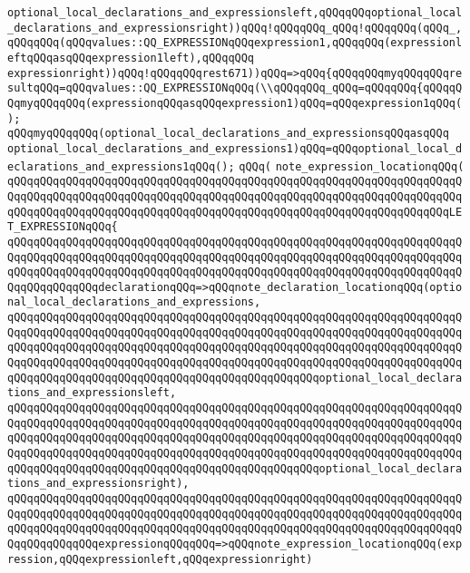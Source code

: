 \verb|optional_local_declarations_and_expressionsleft,qQQqqQQqoptional_local_declarations_and_expressionsright))qQQq!qQQqqQQq_qQQq!qQQqqQQq(qQQq_,qQQqqQQq(qQQqvalues::QQ_EXPRESSIONqQQqexpression1,qQQqqQQq(expressionleftqQQqasqQQqexpression1left),qQQqqQQq|\newline
\verb|expressionright))qQQq!qQQqqQQqrest671))qQQq=>qQQq{qQQqqQQqmyqQQqqQQqresultqQQq=qQQqvalues::QQ_EXPRESSIONqQQq(\\qQQqqQQq_qQQq=qQQqqQQq{qQQqqQQqmyqQQqqQQq(expressionqQQqasqQQqexpression1)qQQq=qQQqexpression1qQQq();|\newline
\verb|qQQqmyqQQqqQQq(optional_local_declarations_and_expressionsqQQqasqQQq|\newline
\verb|optional_local_declarations_and_expressions1)qQQq=qQQqoptional_local_declarations_and_expressions1qQQq();|\newline
\verb|qQQq(|\newline
\verb|note_expression_locationqQQq(|\newline
\verb|qQQqqQQqqQQqqQQqqQQqqQQqqQQqqQQqqQQqqQQqqQQqqQQqqQQqqQQqqQQqqQQqqQQqqQQqqQQqqQQqqQQqqQQqqQQqqQQqqQQqqQQqqQQqqQQqqQQqqQQqqQQqqQQqqQQqqQQqqQQqqQQqqQQqqQQqqQQqqQQqqQQqqQQqqQQqqQQqqQQqqQQqqQQqqQQqqQQqqQQqqQQqqQQqLET_EXPRESSIONqQQq{|\newline
\verb|qQQqqQQqqQQqqQQqqQQqqQQqqQQqqQQqqQQqqQQqqQQqqQQqqQQqqQQqqQQqqQQqqQQqqQQqqQQqqQQqqQQqqQQqqQQqqQQqqQQqqQQqqQQqqQQqqQQqqQQqqQQqqQQqqQQqqQQqqQQqqQQqqQQqqQQqqQQqqQQqqQQqqQQqqQQqqQQqqQQqqQQqqQQqqQQqqQQqqQQqqQQqqQQqqQQqqQQqqQQqqQQqdeclarationqQQq=>qQQqnote_declaration_locationqQQq(optional_local_declarations_and_expressions,|\newline
\verb|qQQqqQQqqQQqqQQqqQQqqQQqqQQqqQQqqQQqqQQqqQQqqQQqqQQqqQQqqQQqqQQqqQQqqQQqqQQqqQQqqQQqqQQqqQQqqQQqqQQqqQQqqQQqqQQqqQQqqQQqqQQqqQQqqQQqqQQqqQQqqQQqqQQqqQQqqQQqqQQqqQQqqQQqqQQqqQQqqQQqqQQqqQQqqQQqqQQqqQQqqQQqqQQqqQQqqQQqqQQqqQQqqQQqqQQqqQQqqQQqqQQqqQQqqQQqqQQqqQQqqQQqqQQqqQQqqQQqqQQqqQQqqQQqqQQqqQQqqQQqqQQqqQQqqQQqqQQqqQQqqQQqqQQqoptional_local_declarations_and_expressionsleft,|\newline
\verb|qQQqqQQqqQQqqQQqqQQqqQQqqQQqqQQqqQQqqQQqqQQqqQQqqQQqqQQqqQQqqQQqqQQqqQQqqQQqqQQqqQQqqQQqqQQqqQQqqQQqqQQqqQQqqQQqqQQqqQQqqQQqqQQqqQQqqQQqqQQqqQQqqQQqqQQqqQQqqQQqqQQqqQQqqQQqqQQqqQQqqQQqqQQqqQQqqQQqqQQqqQQqqQQqqQQqqQQqqQQqqQQqqQQqqQQqqQQqqQQqqQQqqQQqqQQqqQQqqQQqqQQqqQQqqQQqqQQqqQQqqQQqqQQqqQQqqQQqqQQqqQQqqQQqqQQqqQQqqQQqqQQqqQQqoptional_local_declarations_and_expressionsright),|\newline
\verb|qQQqqQQqqQQqqQQqqQQqqQQqqQQqqQQqqQQqqQQqqQQqqQQqqQQqqQQqqQQqqQQqqQQqqQQqqQQqqQQqqQQqqQQqqQQqqQQqqQQqqQQqqQQqqQQqqQQqqQQqqQQqqQQqqQQqqQQqqQQqqQQqqQQqqQQqqQQqqQQqqQQqqQQqqQQqqQQqqQQqqQQqqQQqqQQqqQQqqQQqqQQqqQQqqQQqqQQqqQQqqQQqexpressionqQQqqQQq=>qQQqnote_expression_locationqQQq(expression,qQQqexpressionleft,qQQqexpressionright)|\newline
